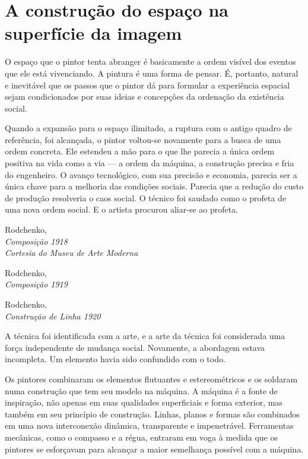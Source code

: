 \documentclass[a4paper]{article}
\begin{document}
\raggedright

\section*{A construção do espaço na superfície da imagem}

O espaço que o pintor tenta abranger é basicamente a ordem visível dos eventos que ele está vivenciando. A pintura é uma forma de pensar. É, portanto, natural e inevitável que os passos que o pintor dá para formular a experiência espacial sejam condicionados por suas ideias e concepções da ordenação da existência social.

Quando a expansão para o espaço ilimitado, a ruptura com o antigo quadro de referência, foi alcançada, o pintor voltou-se novamente para a busca de uma ordem concreta. Ele estendeu a mão para o que lhe parecia a única ordem positiva na vida como a via --- a ordem da máquina, a construção precisa e fria do engenheiro. O avanço tecnológico, com sua precisão e economia, parecia ser a única chave para a melhoria das condições sociais. Parecia que a redução do custo de produção resolveria o caos social. O técnico foi saudado como o profeta de uma nova ordem social. E o artista procurou aliar-se ao profeta.

Rodchenko,\\
\textit{Composição 1918}\\
\textit{Cortesia do Museu de Arte Moderna}

Rodchenko,\\
\textit{Composição 1919}

Rodchenko,\\
\textit{Construção de Linha 1920}

A técnica foi identificada com a arte, e a arte da técnica foi considerada uma força independente de mudança social. Novamente, a abordagem estava incompleta. Um elemento havia sido confundido com o todo.

Os pintores combinaram os elementos flutuantes e estereométricos e os soldaram numa construção que tem seu modelo na máquina. A máquina é a fonte de inspiração, não apenas em suas qualidades superficiais e forma exterior, mas também em seu princípio de construção. Linhas, planos e formas são combinados em uma nova interconexão dinâmica, transparente e impenetrável. Ferramentas mecânicas, como o compasso e a régua, entraram em voga à medida que os pintores se esforçavam para alcançar a maior semelhança possível com a máquina.

\vfill
{}
\end{document}
